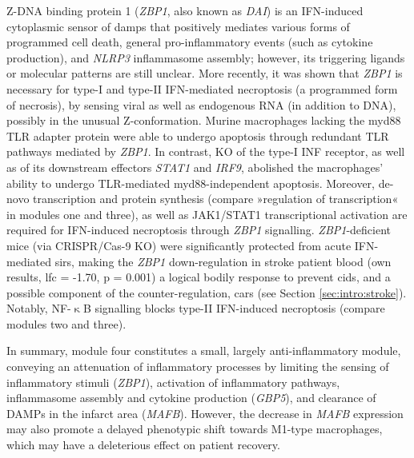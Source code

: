 Z-DNA binding protein 1 (\emph{ZBP1}, also known as \emph{DAI}) is an IFN-induced cytoplasmic sensor of \acp{damp} that positively mediates various forms of programmed cell death, general pro-inflammatory events (such as cytokine production), and \emph{NLRP3} inflammasome assembly; however, its triggering ligands or molecular patterns are still unclear.\cite{Kuriakose2018} More recently, it was shown that \emph{ZBP1} is necessary for type-I and type-II IFN-mediated necroptosis (a programmed form of necrosis),\cite{Yang2019} by sensing viral as well as endogenous RNA (in addition to DNA), possibly in the unusual Z-conformation.\cite{Maelfait2017} Murine macrophages lacking the \ac{myd88} TLR adapter protein were able to undergo apoptosis through redundant TLR pathways mediated by \emph{ZBP1}. In contrast, KO of the type-I INF receptor, as well as of its downstream effectors \emph{STAT1} and \emph{IRF9}, abolished the macrophages' ability to undergo TLR-mediated \ac{myd88}-independent apoptosis.\cite{Kuriakose2016} Moreover, de-novo transcription and protein synthesis (compare »regulation of transcription« in modules one and three), as well as JAK1/STAT1 transcriptional activation are required for IFN-induced necroptosis through \emph{ZBP1} signalling.\cite{Yang2019} \emph{ZBP1}-deficient mice (via CRISPR/Cas-9 KO) were significantly protected from acute IFN-mediated \acf{sirs},\cite{Yang2019} making the \emph{ZBP1} down-regulation in stroke patient blood (own results, \ac{lfc} = -1.70, p = 0.001) a logical bodily response to prevent \acf{cids}, and a possible component of the counter-regulation, \acf{cars} (see Section \ref{sec:intro:stroke}). Notably, NF-$\upkappa$B signalling blocks type-II IFN-induced necroptosis (compare modules two and three).\cite{Thapa2011}


In summary, module four constitutes a small, largely anti-inflammatory module, conveying an attenuation of inflammatory processes by limiting the sensing of inflammatory stimuli (\emph{ZBP1}), activation of inflammatory pathways, inflammasome assembly and cytokine production (\emph{GBP5}), and clearance of DAMPs in the infarct area (\emph{MAFB}). However, the decrease in \emph{MAFB} expression may also promote a delayed phenotypic shift towards M1-type macrophages, which may have a deleterious effect on patient recovery.


